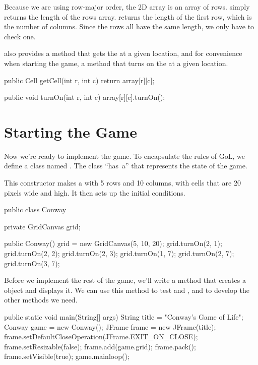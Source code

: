 Because we are using row-major order, the 2D array is an array of rows.
 simply returns the length of the rows array.
 returns the length of the first row, which is the number of columns.
Since the rows all have the same length, we only have to check one.

 also provides a method that gets the  at a given location, and for convenience when starting the game, a method that turns on the  at a given location.

\begin{code}
public Cell getCell(int r, int c) {
    return array[r][c];
}

public void turnOn(int r, int c) {
    array[r][c].turnOn();
}
\end{code}


\section{Starting the Game}
\label{conwaymain}

Now we're ready to implement the game.
To encapsulate the rules of GoL, we define a class named .
The  class ``has~a''  that represents the state of the game.

This constructor makes a  with 5 rows and 10 columns, with cells that are 20 pixels wide and high.
It then sets up the initial conditions.

\begin{code}
public class Conway {
    private GridCanvas grid;

    public Conway() {
        grid = new GridCanvas(5, 10, 20);
        grid.turnOn(2, 1);
        grid.turnOn(2, 2);
        grid.turnOn(2, 3);
        grid.turnOn(1, 7);
        grid.turnOn(2, 7);
        grid.turnOn(3, 7);
    }
}
\end{code}

Before we implement the rest of the game, we'll write a  method that creates a  object and displays it.
We can use this method to test  and , and to develop the other methods we need.

\begin{code}
public static void main(String[] args) {
    String title = "Conway's Game of Life";
    Conway game = new Conway();
    JFrame frame = new JFrame(title);
    frame.setDefaultCloseOperation(JFrame.EXIT_ON_CLOSE);
    frame.setResizable(false);
    frame.add(game.grid);
    frame.pack();
    frame.setVisible(true);
    game.mainloop();
}
\end{code}

